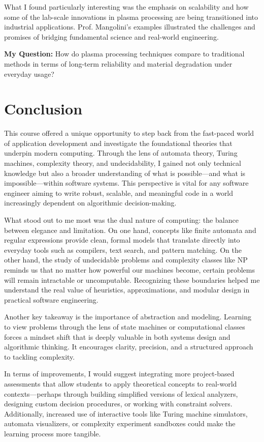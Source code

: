 \documentclass{article}
\theoremstyle{theorem}
\theoremstyle{definition}
\theoremstyle{remark}
\begin{document}
What I found particularly interesting was the emphasis on scalability and how some of the lab-scale innovations in plasma processing are being transitioned into industrial applications. Prof. Mangolini’s examples illustrated the challenges and promises of bridging fundamental science and real-world engineering.

\textbf{My Question:} How do plasma processing techniques compare to traditional methods in terms of long-term reliability and material degradation under everyday usage?

\section{Conclusion}\label{conclusion}

This course offered a unique opportunity to step back from the fast-paced world of application development and investigate the foundational theories that underpin modern computing. Through the lens of automata theory, Turing machines, complexity theory, and undecidability, I gained not only technical knowledge but also a broader understanding of what is possible—and what is impossible—within software systems. This perspective is vital for any software engineer aiming to write robust, scalable, and meaningful code in a world increasingly dependent on algorithmic decision-making.

What stood out to me most was the dual nature of computing: the balance between elegance and limitation. On one hand, concepts like finite automata and regular expressions provide clean, formal models that translate directly into everyday tools such as compilers, text search, and pattern matching. On the other hand, the study of undecidable problems and complexity classes like NP reminds us that no matter how powerful our machines become, certain problems will remain intractable or uncomputable. Recognizing these boundaries helped me understand the real value of heuristics, approximations, and modular design in practical software engineering.

Another key takeaway is the importance of abstraction and modeling. Learning to view problems through the lens of state machines or computational classes forces a mindset shift that is deeply valuable in both systems design and algorithmic thinking. It encourages clarity, precision, and a structured approach to tackling complexity.

In terms of improvements, I would suggest integrating more project-based assessments that allow students to apply theoretical concepts to real-world contexts—perhaps through building simplified versions of lexical analyzers, designing custom decision procedures, or working with constraint solvers. Additionally, increased use of interactive tools like Turing machine simulators, automata visualizers, or complexity experiment sandboxes could make the learning process more tangible.
\end{document}
